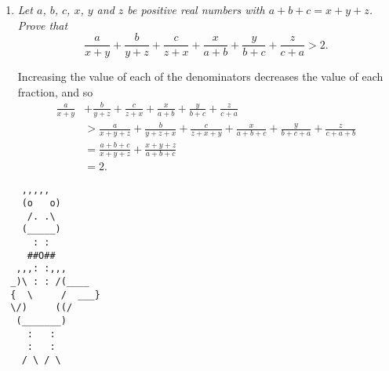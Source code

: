 \documentclass{article}
\begin{document}
\begin{enumerate}[1.]
  
  \item %
  {\itshape Let $a$, $b$, $c$, $x$, $y$ and $z$ be positive real numbers with $a + b + c = x + y + z$.
  Prove that 
  \[ \frac{a}{x + y} + \frac{b}{y + z} + \frac{c}{z + x} + \frac{x}{a + b} + \frac{y}{b + c} + \frac{z}{c + a} > 2. \]}
  
  Increasing the value of each of the denominators decreases the value of each fraction, and so
  \begin{align*}
    \frac{a}{x + y} & + \frac{b}{y + z} + \frac{c}{z + x} + \frac{x}{a + b} + \frac{y}{b + c} + \frac{z}{c + a} \\
    & > \frac{a}{x + y + z} + \frac{b}{y + z + x} + \frac{c}{z + x + y} + \frac{x}{a + b + c} + \frac{y}{b + c + a} + \frac{z}{c + a + b} \\
    & = \frac{a + b + c}{x + y + z} + \frac{x + y + z}{a + b + c} \\
    & = 2.
  \end{align*}
  
  \end{enumerate}
  
  \vfill
  \centering
  \begin{BVerbatim}
    ,,,,,
    (o   o)
     /. .\ 
    (_____)
      : :
     ##O##
   ,,,: :,,,
  _)\ : : /(____
  {  \     /  ___}
  \/)     ((/
   (_______)
     :   :
     :   :
    / \ / \
  \end{BVerbatim}
  
\end{document}
